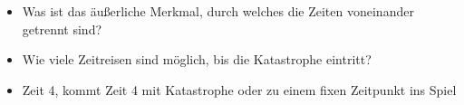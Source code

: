 \begin{itemize}
  \item Was ist das äußerliche Merkmal, durch welches die Zeiten voneinander getrennt sind?
  \item Wie viele Zeitreisen sind möglich, bis die Katastrophe eintritt?
  \item Zeit 4, kommt Zeit 4 mit Katastrophe oder zu einem fixen Zeitpunkt ins Spiel
\end{itemize}
